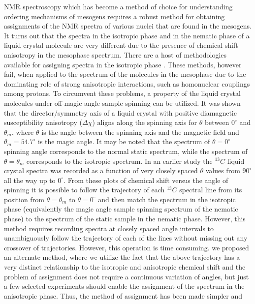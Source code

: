 NMR spectroscopy which has become a method of choice for understanding
ordering mechanisms of mesogens requires a robust method for obtaining
assignments of the NMR spectra of various nuclei that are found in the mesogens.
It turns out that the spectra in the isotropic phase and in the nematic phase of a
liquid crystal molecule are very different due to the presence of chemical shift
anisotropy in the mesophase spectrum. There are a host of methodologies
available for assigning spectra in the isotropic phase \cite{chap22-key4}. These methods, however
fail, when applied to the spectrum of the molecules in the mesophase due to the
dominating role of strong anisotropic interactions, such as homonuclear
couplings among protons. To circumvent these problems, a property of the liquid
crystal molecules under off-magic angle sample spinning can be utilized. It was
shown that the director/symmetry axis of a liquid crystal with positive
diamagnetic susceptibility anisotropy ($\Delta \chi$) aligns along the spinning axis for $\theta$
between $0^{\circ}$ and $\theta_m$, where $\theta$ is the angle between the spinning axis and the
magnetic field and $\theta_m = 54.7^{\circ}$ is the magic angle. It may be noted that the
spectrum of $\theta = 0^{\circ}$ spinning angle corresponds to the normal static spectrum,
while the spectrum of $\theta = \theta_m$ corresponds to the isotropic spectrum. In an earlier
study the ${}^{13}C$ liquid crystal spectra was recorded as a function of very closely
spaced $\theta$ values from $90^{\circ}$ all the way up to $0^{\circ}$. From these plots of chemical shift
versus the angle of spinning it is possible to follow the trajectory of each
${}^{13}C$ spectral line from its position from $\theta = \theta_m$ to $\theta = 0^\circ$ and then match the spectrum
in the isotropic phase (equivalently the magic angle sample spinning spectrum of
the nematic phase) to the spectrum of the static sample in the nematic phase.
However, this method requires recording spectra at closely spaced angle intervals
to unambiguously follow the trajectory of each of the lines without missing out
any crossover of trajectories. However, this operation is time consuming. we
proposed an alternate method, where we utilize the fact that the above trajectory
has a very distinct relationship to the isotropic and anisotropic chemical shift and
the problem of assignment does not require a continuous variation of angles, but
just a few selected experiments should enable the assignment of the spectrum in
the anisotropic phase. Thus, the method of assignment has been made simpler and
